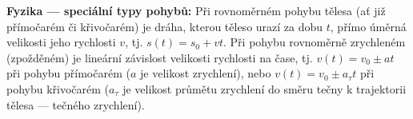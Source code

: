 \wikitextrule
\begin{example}\label{mai:exam036}
  \textbf{Fyzika — speciální typy pohybů:}\newline\small
  Při rovnoměrném pohybu tělesa (ať již přímočarém či křivočarém) je dráha, kterou těleso urazí za 
  dobu \(t\), přímo úměrná velikosti jeho rychlosti \(v\), tj. \(s(t) = s_0 + vt\). Při pohybu 
  rovnoměrně zrychleném (zpožděném) je lineární závislost velikosti rychlosti na čase, tj. \(v(t) = 
  v_0 \pm at\) při pohybu přímočarém (\(a\) je velikost zrychlení), nebo \(v(t) = v_0 \pm a_\tau 
  t\) při pohybu křivočarém (\(a_\tau\) je velikost průmětu zrychlení do směru tečny k 
  trajektorii tělesa — tečného zrychlení).
  \normalsize
\end{example}